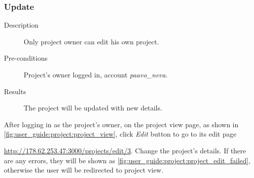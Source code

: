 \clearpage

\subsubsection{Update}
\label{ch:appendix-a:user_guide:project:update}

\begin{description}
\item[Description] Only project owner can edit his own project.
\item[Pre-conditions] Project's owner logged in, \eg account \emph{paavo\_neva}.
\item[Results] The project will be updated with new details.
\end{description}

After logging in as the project's owner, on the project view page, as shown in \autoref{fig:user_guide:project:project_view}, click \emph{Edit} button to go to its edit page 

\noindent\href{http://178.62.253.47:3000/projects/edit/3}{http://178.62.253.47:3000/projects/edit/3}.
Change the project's details.
If there are any errors, they will be shown as \autoref{fig:user_guide:project:project_edit_failed}, otherwise the user will be redirected to project view.

